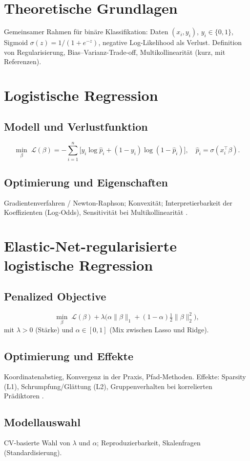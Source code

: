\documentclass[12pt,a4paper]{article}
\begin{document}
\section{Theoretische Grundlagen}
Gemeinsamer Rahmen für binäre Klassifikation:
Daten $(x_i,y_i)$, $y_i\in\{0,1\}$, Sigmoid $\sigma(z)=1/(1+e^{-z})$,
negative Log-Likelihood als Verlust. Definition von Regularisierung,
Bias–Varianz-Trade-off, Multikollinearität (kurz, mit Referenzen).

\section{Logistische Regression}
\subsection{Modell und Verlustfunktion}
\[
  \min_{\beta}\; \mathcal{L}(\beta)
  = -\sum_{i=1}^n \big[ y_i \log \hat p_i + (1-y_i)\log(1-\hat p_i)\big],\quad
  \hat p_i=\sigma(x_i^\top\beta).
\]
\subsection{Optimierung und Eigenschaften}
Gradientenverfahren / Newton-Raphson; Konvexität; Interpretierbarkeit der
Koeffizienten (Log-Odds), Sensitivität bei Multikollinearität
\citep{Hosmer2000Logistic}.

\section{Elastic-Net-regularisierte logistische Regression}
\subsection{Penalized Objective}
\[
  \min_{\beta}\; \mathcal{L}(\beta)
  + \lambda\Big(\alpha \lVert \beta \rVert_1 + (1-\alpha)\tfrac{1}{2}\lVert \beta \rVert_2^2\Big),
\]
mit $\lambda>0$ (Stärke) und $\alpha\in[0,1]$ (Mix zwischen Lasso und Ridge).
\subsection{Optimierung und Effekte}
Koordinatenabstieg, Konvergenz in der Praxis, Pfad-Methoden. Effekte:
Sparsity (L1), Schrumpfung/Glättung (L2), Gruppenverhalten bei
korrelierten Prädiktoren \citep{Zou2005ElasticNet}.
\subsection{Modellauswahl}
CV-basierte Wahl von $\lambda$ und $\alpha$; Reproduzierbarkeit, Skalenfragen
(Standardisierung).
\end{document}
